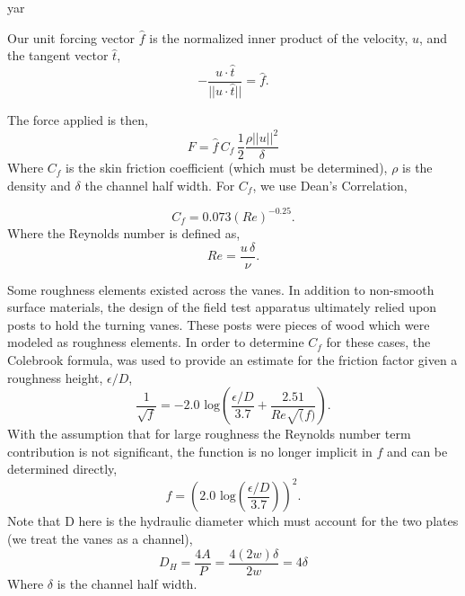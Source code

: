 yar

Our unit forcing vector $\hat f$ is the normalized inner product of the 
velocity, $u$, and the tangent vector $\hat t$, 
\begin{equation}
- \frac{u \cdot \hat t}{|| u \cdot \hat t ||} = \hat f. 
\end{equation}

The force applied is then, 
\begin{equation}
 F = \hat f \, C_f \, \frac{1}{2} \frac{\rho || u ||^2}{\delta}
\end{equation}
Where $C_f$ is the skin friction coefficient (which must be determined),
$\rho $ is the density and $\delta$ the channel half width. 
For $C_f$, we use Dean's Correlation\cite{?}, 

%
%
%
\begin{equation}
 C_f = 0.073 (Re)^{-0.25}. 
\end{equation}
Where the Reynolds number is defined as, 
\begin{equation}
 Re = \frac{u\, \delta}{\nu}.
\end{equation}

Some roughness elements existed across the vanes. In addition to
non-smooth surface materials, the design of the field test apparatus
ultimately relied upon posts to hold the turning vanes. These posts were
pieces of wood which were modeled as roughness elements. In order to
determine $C_f$ for these cases, the Colebrook formula\cite{Colebrook367},
was used to provide an estimate for the friction factor given a
roughness height, $\epsilon/D$,  
\begin{equation}
 \frac{1}{\sqrt{f}} = -2.0 \text{ log}\left(\frac{\epsilon/D}{3.7} + \frac{2.51}{Re\sqrt(f)}\right).
\end{equation}
 With the assumption that for large roughness the Reynolds number term
 contribution is not significant, the function is no longer implicit in
 $f$ and can be determined directly, 
\begin{equation}
 f = \left(2.0 \text{ log}\left(\frac{\epsilon/D}{3.7}\right)\right)^2. 
\end{equation}
Note that D here is the hydraulic diameter which must account for the
two plates (we treat the vanes as a channel),
\begin{equation}
D_H = \frac{4 A}{P} = \frac{4 (2w)\delta}{2w} = 4 \delta
\end{equation}
Where $\delta$ is the channel half width.

